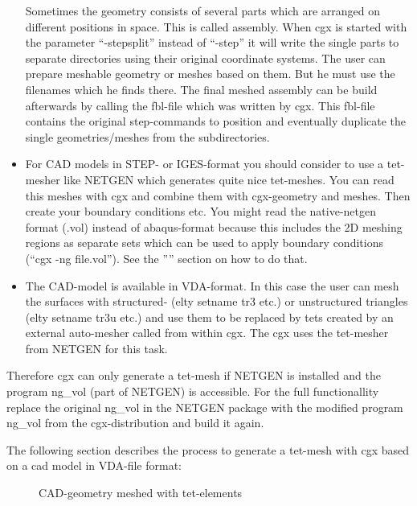 \documentclass{article}
\begin{document}
\begin{appendix}
\begin{itemize}
Sometimes the geometry consists of several parts which are arranged on different positions in space. This is called assembly. When cgx is started with the parameter ``-stepsplit'' instead of ``-step'' it will write the single parts to separate directories using their original coordinate systems. The user can prepare meshable geometry or meshes based on them. But he must use the filenames which he finds there. The final meshed assembly can be build afterwards by calling the fbl-file which was written by cgx. This fbl-file contains the original step-commands to position and eventually duplicate the single geometries/meshes from the subdirectories.   

\item For CAD models in STEP- or IGES-format you should consider to use a tet-mesher like NETGEN \cite{NETGEN} which generates quite nice tet-meshes. You can read this meshes with cgx and combine them with cgx-geometry and meshes. Then create your boundary conditions etc. You might read the native-netgen format (.vol) instead of abaqus-format because this includes the 2D meshing regions as separate sets which can be used to apply boundary conditions (``cgx -ng file.vol''). See the '''' section on how to do that.

\item The CAD-model is available in VDA-format. In this case the user can mesh the surfaces with structured- \cite{Coons} (elty setname tr3 etc.) or unstructured triangles \cite{mesh2d} (elty setname tr3u etc.) and use them to be replaced by tets created by an external auto-mesher called from within cgx. The cgx uses the tet-mesher from NETGEN \cite{NETGEN} for this task. 
\end{itemize}

Therefore cgx can only generate a tet-mesh if NETGEN is installed and the program ng\_vol (part of NETGEN) is accessible. For the full functionallity replace the original ng\_vol in the NETGEN package with the modified program ng\_vol from the cgx-distribution and build it again.

The following section describes the process to generate a tet-mesh with cgx based on a cad model in VDA-file format:


\begin{figure}[h]
\caption{\label{halter} CAD-geometry meshed with tet-elements }
\end{figure}

\begin{itemize}


\end{itemize}
\end{appendix}
\end{document}
